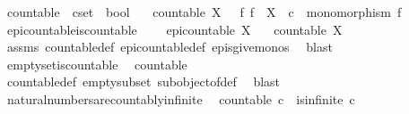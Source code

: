 \begin{isabellebody}
\begin{isamarkuptext}
\end{isamarkuptext}\isamarkuptrue%
\isamarkupfalse%
\ countable\ {\isacharcolon}{\kern0pt}{\isacharcolon}{\kern0pt}\ {\isachardoublequoteopen}cset\ {\isasymRightarrow}\ bool{\isachardoublequoteclose}\ \isanewline
\ \ {\isachardoublequoteopen}countable\ X\ {\isasymlongleftrightarrow}\ {\isacharparenleft}{\kern0pt}{\isasymexists}\ f{\isachardot}{\kern0pt}\ f\ {\isacharcolon}{\kern0pt}\ X\ {\isasymrightarrow}\ {\isasymnat}\isactrlsub c\ {\isasymand}\ monomorphism\ f{\isacharparenright}{\kern0pt}{\isachardoublequoteclose}\isanewline
\isanewline
{}\isamarkupfalse%
\ epi{\isacharunderscore}{\kern0pt}countable{\isacharunderscore}{\kern0pt}is{\isacharunderscore}{\kern0pt}countable{\isacharcolon}{\kern0pt}\ \isanewline
\ \ \ {\isachardoublequoteopen}epi{\isacharunderscore}{\kern0pt}countable\ X{\isachardoublequoteclose}\isanewline
\ \ \ {\isachardoublequoteopen}countable\ X{\isachardoublequoteclose}\isanewline
%
\isadelimproof
\ \ %
\endisadelimproof
%
\isatagproof
{}\isamarkupfalse%
\ assms\ countable{\isacharunderscore}{\kern0pt}def\ epi{\isacharunderscore}{\kern0pt}countable{\isacharunderscore}{\kern0pt}def\ epis{\isacharunderscore}{\kern0pt}give{\isacharunderscore}{\kern0pt}monos\ \isamarkupfalse%
\ blast%
\endisatagproof
{\isafoldproof}%
%
\isadelimproof
\isanewline
%
\endisadelimproof
\isanewline
{}\isamarkupfalse%
\ emptyset{\isacharunderscore}{\kern0pt}is{\isacharunderscore}{\kern0pt}countable{\isacharcolon}{\kern0pt}\isanewline
\ \ {\isachardoublequoteopen}countable\ {\isasymemptyset}{\isachardoublequoteclose}\isanewline
%
\isadelimproof
\ \ %
\endisadelimproof
%
\isatagproof
{}\isamarkupfalse%
\ countable{\isacharunderscore}{\kern0pt}def\ empty{\isacharunderscore}{\kern0pt}subset\ subobject{\isacharunderscore}{\kern0pt}of{\isacharunderscore}{\kern0pt}def{}\ \isamarkupfalse%
\ blast%
\endisatagproof
{\isafoldproof}%
%
\isadelimproof
\isanewline
%
\endisadelimproof
\isanewline
{}\isamarkupfalse%
\ natural{\isacharunderscore}{\kern0pt}numbers{\isacharunderscore}{\kern0pt}are{\isacharunderscore}{\kern0pt}countably{\isacharunderscore}{\kern0pt}infinite{\isacharcolon}{\kern0pt}\isanewline
\ \ {\isachardoublequoteopen}countable\ {\isasymnat}\isactrlsub c\ {\isasymand}\ is{\isacharunderscore}{\kern0pt}infinite\ {\isasymnat}\isactrlsub c{\isachardoublequoteclose}\isanewline
%
\isadelimproof
\ \ %
\endisadelimproof
%
\isatagproof

\end{isabellebody}
